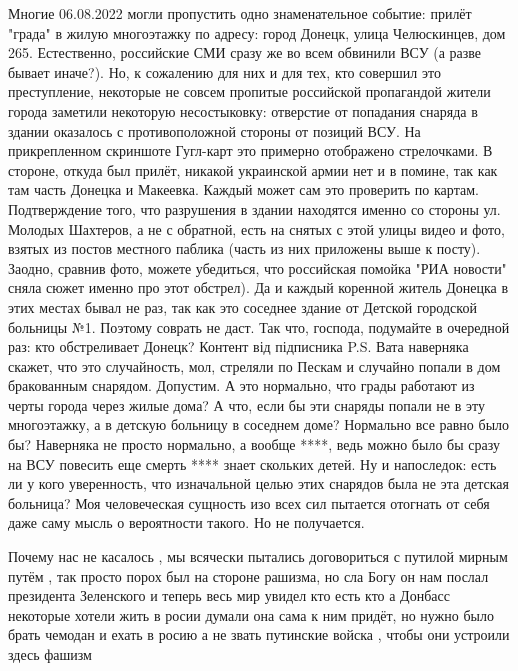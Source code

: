 {%
Многие 06.08.2022 могли пропустить одно знаменательное событие: прилёт "града" в жилую многоэтажку по адресу: город Донецк, улица Челюскинцев, дом 265.
Естественно, российские СМИ сразу же во всем обвинили ВСУ (а разве бывает иначе?). Но, к сожалению для них и для тех, кто совершил это преступление, некоторые не совсем пропитые российской пропагандой жители города заметили некоторую несостыковку:
отверстие от попадания снаряда в здании оказалось с противоположной стороны от позиций ВСУ.
На прикрепленном скриншоте Гугл-карт это примерно отображено стрелочками.
В стороне, откуда был прилёт, никакой украинской армии нет и в помине, так как там часть Донецка и Макеевка. Каждый может сам это проверить по картам.
Подтверждение того, что разрушения в здании находятся именно со стороны ул. Молодых Шахтеров, а не с обратной, есть на снятых с этой улицы видео и фото, взятых из постов местного паблика (часть из них приложены выше к посту).
Заодно, сравнив фото, можете убедиться, что российская помойка "РИА новости" сняла сюжет именно про этот обстрел).
Да и каждый коренной житель Донецка в этих местах бывал не раз, так как это соседнее здание от Детской городской больницы №1. Поэтому соврать не даст.
Так что, господа, подумайте в очередной раз: кто обстреливает Донецк?
Контент від підписника
P.S. Вата наверняка скажет, что это случайность, мол, стреляли по Пескам и случайно попали в дом бракованным снарядом. Допустим. А это нормально, что грады работают из черты города через жилые дома? А что, если бы эти снаряды попали не в эту многоэтажку, а в детскую больницу в соседнем доме? Нормально все равно было бы? Наверняка не просто нормально, а вообще ****, ведь можно было бы сразу на ВСУ повесить еще смерть **** знает скольких детей.
Ну и напоследок: есть ли у кого уверенность, что изначальной целью этих снарядов была не эта детская больница? Моя человеческая сущность изо всех сил пытается отогнать от себя даже саму мысль о вероятности такого. Но не получается. 👿 👿 👿


Почему нас не касалось , мы всячески пытались договориться с путилой мирным
путём , так просто порох был на стороне рашизма, но сла Богу он нам послал
президента Зеленского и теперь весь мир увидел кто есть кто а Донбасс некоторые
хотели жить в росии думали она сама к ним придёт, но нужно было брать чемодан и
ехать в росию а не звать путинские войска , чтобы они устроили здесь фашизм


}
